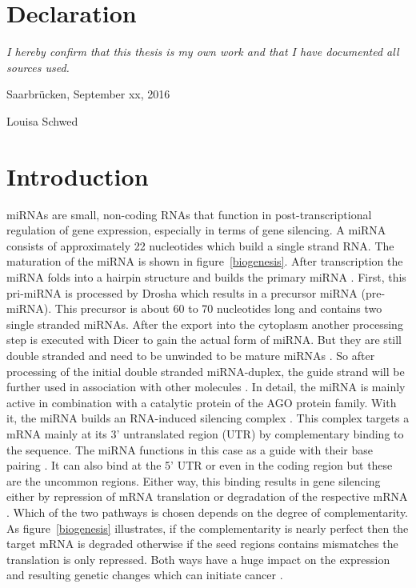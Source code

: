 \documentclass[12pt]{article}
\begin{document}
\section*{Declaration}
\emph{I hereby confirm that this thesis is my own work and that I have documented all sources used.}

\vspace{1cm}

\noindent Saarbr\"ucken, September xx, 2016
\vspace{1.5cm}

\noindent Louisa Schwed
\newpage
\mbox{}



\tableofcontents

\newpage 
\pagestyle{plain}



 
\section{Introduction}

miRNAs are small, non-coding RNAs that function in post-transcriptional regulation of gene expression, especially in terms of gene silencing. A miRNA consists of approximately 22 nucleotides which build a single strand RNA. The maturation of the miRNA is shown in figure~\ref{biogenesis}. After transcription the miRNA folds into a hairpin structure and builds the primary miRNA \cite{Macfarlane}. First, this pri-miRNA is processed by Drosha which results in a precursor miRNA (pre-miRNA). This precursor is about 60 to 70 nucleotides long and contains two single stranded miRNAs. After the export into the cytoplasm another processing step is executed with Dicer to gain the actual form of miRNA. But they are still double stranded and need to be unwinded to be mature miRNAs \cite{Macfarlane}. So after processing of the initial double stranded miRNA-duplex, the guide strand will be further used in association with other molecules \cite{Grunz}. In detail, the miRNA is mainly active in combination with a catalytic protein of the AGO protein family. With it, the miRNA builds an RNA-induced silencing complex \cite{Ha}. This complex targets a mRNA mainly at its 3' untranslated region (UTR) by complementary binding to the sequence. The miRNA functions in this case as a guide with their base pairing \cite{Macfarlane}. It can also bind at the 5' UTR or even in the coding region but these are the uncommon regions. Either way, this binding results in gene silencing either by repression of mRNA translation or degradation of the respective mRNA \cite{Enright}. Which of the two pathways is chosen depends on the degree of complementarity. As figure~\ref{biogenesis} illustrates, if the complementarity is nearly perfect then the target mRNA is degraded otherwise if the seed regions contains mismatches the translation is only repressed. Both ways have a huge impact on the expression and resulting genetic changes which can initiate cancer \cite{Macfarlane}.\\
\end{document}
